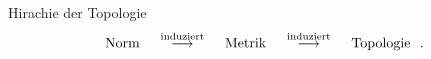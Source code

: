 \documentclass[class=article, crop=false]{standalone}
\begin{document}
\begin{zettel}{Hirachie der Topologie}
\[
        \tx{ Norm } \stackrel{\tx{ induziert } }{\longrightarrow} \tx{ Metrik }  \stackrel{\tx{ induziert } }{\longrightarrow} \tx{ Topologie }\\
.\]
\end{zettel}
\end{document}
